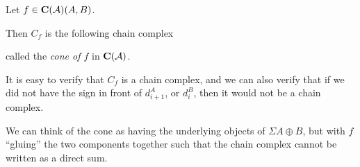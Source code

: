 \begin{definition}[Cone in \( \C(\Ac) \)]
    Let \( f \in \operatorname{\mathbf{C}}({\mathcal{A}})(A, B) \).

    Then \( C_f \) is the following chain complex
    \begin{center}
    \end{center}
    called the \emph{cone of \( f \)} in \( \C(\Ac) \).
\end{definition}

It is easy to verify that \( C_f \) is a chain complex, and we can also verify that if we did not have the sign in front of \( d_{i + 1}^A \), or  \( d_i^B \), then it would not be a chain complex.

We can think of the cone as having the underlying objects of \( \Sigma A \oplus B \), but with \( f \) ``gluing'' the two components together such that the chain complex cannot be written as a direct sum.

